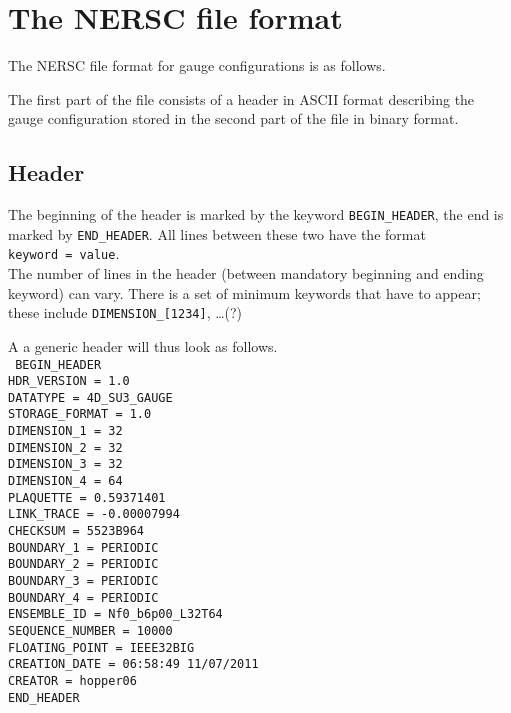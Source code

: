 \chapter{The NERSC file format}

The NERSC file format for gauge configurations is as follows.

The first part of the file consists of a header in ASCII format describing the gauge configuration stored in the
second part of the file in binary format.

\section{Header}

The beginning of the header is marked by the keyword \texttt{BEGIN\_HEADER}, the end is marked
by \texttt{END\_HEADER}. All lines between these two have the format \\
\texttt{keyword = value}.\\

The number of lines in the header (between mandatory beginning and ending keyword) can vary. There is a
set of minimum keywords that have to appear; these include \texttt{DIMENSION\_[1234]}, \ldots (?)


A a generic header will thus look as follows. \\
\texttt{
BEGIN\_HEADER \\
HDR\_VERSION = 1.0 \\
DATATYPE = 4D\_SU3\_GAUGE \\
STORAGE\_FORMAT = 1.0 \\
DIMENSION\_1 = 32 \\
DIMENSION\_2 = 32 \\
DIMENSION\_3 = 32 \\
DIMENSION\_4 = 64 \\
PLAQUETTE = 0.59371401 \\
LINK\_TRACE = -0.00007994 \\
CHECKSUM = 5523B964 \\
BOUNDARY\_1 = PERIODIC \\
BOUNDARY\_2 = PERIODIC \\
BOUNDARY\_3 = PERIODIC \\
BOUNDARY\_4 = PERIODIC \\
ENSEMBLE\_ID = Nf0\_b6p00\_L32T64 \\
SEQUENCE\_NUMBER = 10000 \\
FLOATING\_POINT = IEEE32BIG \\
CREATION\_DATE = 06:58:49 11/07/2011  \\
CREATOR = hopper06 \\
END\_HEADER \\
}

